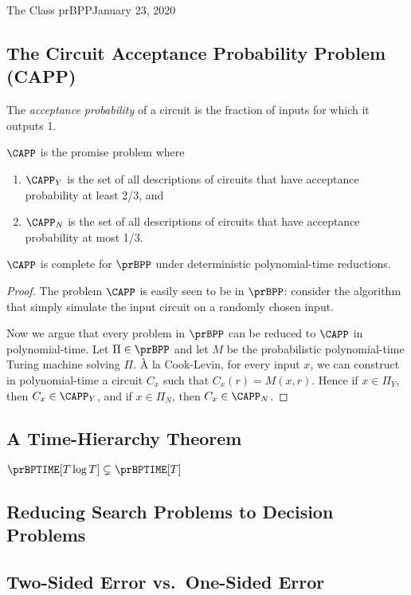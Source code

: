 \begin{lecture}{1}{The Class prBPP}{January 23, 2020}

\subsection{The Circuit Acceptance Probability Problem (CAPP)}

The \emph{acceptance probability} of a circuit is the fraction of inputs for
which it outputs 1.

\begin{definition}[$\CAPP$]
  $\CAPP$ is the promise problem where
  \begin{enumerate}
    \item $\CAPP_Y$ is the set of all descriptions of circuits that have
      acceptance probability at least 2/3, and
    \item $\CAPP_N$ is the set of all descriptions of circuits that have
      acceptance probability at most 1/3.
  \end{enumerate}
\end{definition}

\begin{theorem}
  $\CAPP$ is complete for $\prBPP$ under deterministic polynomial-time reductions.
\end{theorem}


\begin{proof}
  The problem $\CAPP$ is easily seen to be in $\prBPP$: consider the algorithm
  that simply simulate the input circuit on a randomly chosen input.

  Now we argue that every problem in $\prBPP$ can be reduced to $\CAPP$ in
  polynomial-time. Let $\Pi \in \prBPP$ and let $M$ be the probabilistic
  polynomial-time Turing machine solving $\Pi$. {\`A} la Cook-Levin, for every
  input $x$, we can construct in polynomial-time a circuit $C_x$ such that
  $C_x(r) = M(x, r)$. Hence if $x \in \Pi_Y$, then $C_x \in \CAPP_Y$, and if $x
  \in \Pi_N$, then $C_x \in \CAPP_N$.
\end{proof}

\subsection{A Time-Hierarchy Theorem}

\begin{theorem}
  $\prBPTIME[T \log{T}] \subsetneq \prBPTIME[T]$
\end{theorem}


\subsection{Reducing Search Problems to Decision Problems}

\subsection{Two-Sided Error vs.\ One-Sided Error}

\end{lecture}
